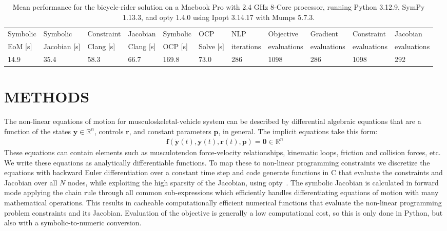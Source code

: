 \documentclass[11pt,twocolumn]{article}
\begin{document}
\begin{table}[t]
  \centering
  \caption{\small Mean performance for the bicycle-rider solution on a Macbook Pro
    with 2.4 GHz 8-Core processor, running Python 3.12.9, SymPy 1.13.3, and
    opty 1.4.0 using Ipopt 3.14.17 with Mumps 5.7.3.}
  \scriptsize
  \begin{tabular}{lllllllllll}
    \toprule
    Symbolic &
    Symbolic &
    Constraint &
    Jacobian &
    Symbolic &
    OCP &
    NLP &
    Objective &
    Gradient &
    Constraint &
    Jacobian
    \\
    EoM [s] &
    Jacobian [s] &
    Clang [s] &
    Clang [s] &
    OCP [s] &
    Solve [s] &
    iterations &
    evaluations &
    evaluations &
    evaluations &
    evaluations
    \\
    \midrule
    14.9 &
    35.4 &
    58.3 &
    66.7 &
    169.8 &
    73.0 &
    286 &
    1098 &
    286 &
    1098 &
    292
    \\
    \bottomrule
  \end{tabular}
  \label{tab:performance}
\end{table}

\vspace{-1em}
\section*{METHODS}
\vspace{-1em}
%
The non-linear equations of motion for musculoskeletal-vehicle system can be
described by differential algebraic equations that are a function of the states
\(\mathbf{y} \in \mathbb{R}^n\), controls \(\mathbf{r}\), and constant
parameters \(\mathbf{p}\), in general. The implicit equations take this form:
%
\begin{align}
  \mathbf{f}(\dot{\mathbf{y}}(t), \mathbf{y}(t), \mathbf{r}(t), \mathbf{p}) =
  \mathbf{0} \in \mathbb{R}^n
\end{align}
%
These equations can contain elements such as musculotendon force-velocity
relationships, kinematic loops, friction and collision forces, etc. We write
these equations as analytically differentiable functions. To map these to
non-linear programming constraints we discretize the equations with backward
Euler differentiation over a constant time step and code generate functions in
C that evaluate the constraints and Jacobian over all \(N\) nodes, while
exploiting the high sparsity of the Jacobian, using opty~\cite{Moore2018}. The
symbolic Jacobian is calculated in forward mode applying the chain rule through
all common sub-expressions which efficiently handles differentiating equations
of motion with many mathematical operations. This results in cacheable
computationally efficient numerical functions that evaluate the non-linear
programming problem constraints and its Jacobian. Evaluation of the objective
is generally a low computational cost, so this is only done in Python, but also
with a symbolic-to-numeric conversion.
\end{document}
